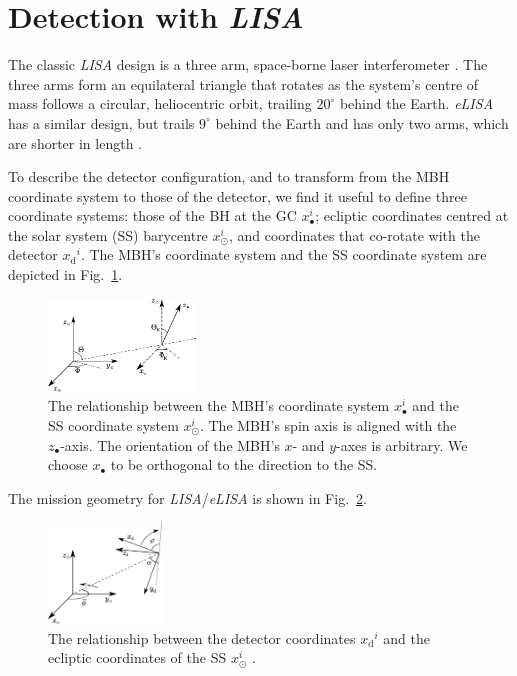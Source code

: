 \documentclass[useAMS,usedcolumn,usegraphicx,usenatbib]{mn2e}
\newcommand{\figref}[1]{Fig.~\ref{fig:#1}}
\newcommand{\sub}[1]{\ensuremath{_\mathrm{#1}}}
\begin{document}
\section{Detection with \textit{LISA}}\label{sec:Detector}

The classic \textit{LISA} design is a three arm, space-borne laser interferometer \citep{Bender1998, Danzmann2003}. The three arms form an equilateral triangle that rotates as the system's centre of mass follows a circular, heliocentric orbit, trailing $20^{\circ}$ behind the Earth. \textit{eLISA} has a similar design, but trails $9^{\circ}$ behind the Earth and has only two arms, which are shorter in length \citep{Jennrich2011}.

To describe the detector configuration, and to transform from the MBH coordinate system to those of the detector, we find it useful to define three coordinate systems: those of the BH at the GC $x_\bullet^i$; ecliptic coordinates centred at the solar system (SS) barycentre $x_\odot^i$, and coordinates that co-rotate with the detector $x\sub{d}^i$. The MBH's coordinate system and the SS coordinate system are depicted in \figref{BH_SS}.
\begin{figure}
\begin{center}
 \includegraphics[width=0.35\textwidth]{BH_SS_angles.eps}
    \caption{The relationship between the MBH's coordinate system $x_\bullet^i$ and the SS coordinate system $x_\odot^i$. The MBH's spin axis is aligned with the $z_\bullet$-axis. The orientation of the MBH's $x$- and $y$-axes is arbitrary. We choose $x_\bullet$ to be orthogonal to the direction to the SS.}
   \label{fig:BH_SS}
\end{center}
\end{figure}
The mission geometry for \textit{LISA}/\textit{eLISA} is shown in \figref{SS_LISA}.
\begin{figure}
\begin{center}
 \includegraphics[width=0.27\textwidth]{SS_LISA.eps}
    \caption{The relationship between the detector coordinates $x\sub{d}^i$ and the ecliptic coordinates of the SS $x_\odot^i$ \citep{Bender1998, Jennrich2011}.}
   \label{fig:SS_LISA}
\end{center}
\end{figure}
\end{document}
